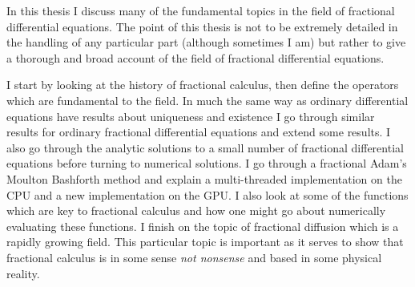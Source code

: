 In this thesis I discuss many of the fundamental topics in the field of fractional differential equations. The point of this thesis is not to be extremely detailed in the handling of any particular part (although sometimes I am) but rather to give a thorough and broad account of the field of fractional differential equations. 

I start by looking at the history of fractional calculus, then define the operators which are fundamental to the field. In much the same way as ordinary differential equations have results about uniqueness and existence I go through similar results for ordinary fractional differential equations and extend some results. I also go through the analytic solutions to a small number of fractional differential equations before turning to numerical solutions. I go through a fractional Adam's Moulton Bashforth method and explain a multi-threaded implementation on the CPU and a new implementation on the GPU. I also look at some of the functions which are key to fractional calculus and how one might go about numerically evaluating these functions. I finish on the topic of fractional diffusion which is a rapidly growing field. This particular topic is important as it serves to show that fractional calculus is in some sense \emph{not nonsense} and based in some physical reality.
